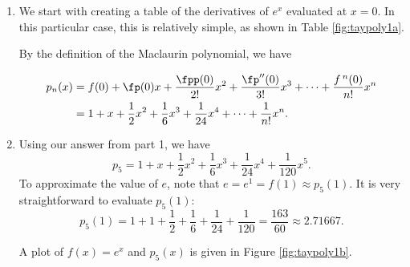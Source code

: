 \begin{solution}
{\begin{enumerate}
\item We start with creating a table of the derivatives of $e^x$ evaluated at $x=0$. In this particular case, this is relatively simple, as shown in Table \ref{fig:taypoly1a}.


By the definition of the Maclaurin polynomial, we have 

\begin{align*}
p_n(x) &= f(0) + \fp(0)x + \frac{\fpp(0)}{2!}x^2+\frac{\fp''(0)}{3!}x^3+\cdots+\frac{f\,^n(0)}{n!}x^n\\
			&= 1+x+\frac{1}{2}x^2+\frac{1}{6}x^3 + \frac{1}{24}x^4 + \cdots + \frac{1}{n!}x^n.
\end{align*}

\item	Using our answer from part 1, we have $$p_5 = 1+x+\frac{1}{2}x^2+\frac{1}{6}x^3 + \frac{1}{24}x^4 + \frac{1}{120}x^5.$$ To approximate the value of $e$, note that $e = e^1 = f(1) \approx p_5(1).$ It is very straightforward to evaluate $p_5(1)$:
$$p_5(1) = 1+1+\frac12+\frac16+\frac1{24}+\frac1{120} = \frac{163}{60} \approx 2.71667.$$

A plot of $f(x)=e^x$ and $p_5(x)$ is given in Figure \ref{fig:taypoly1b}.

\end{enumerate}}
\end{solution}
